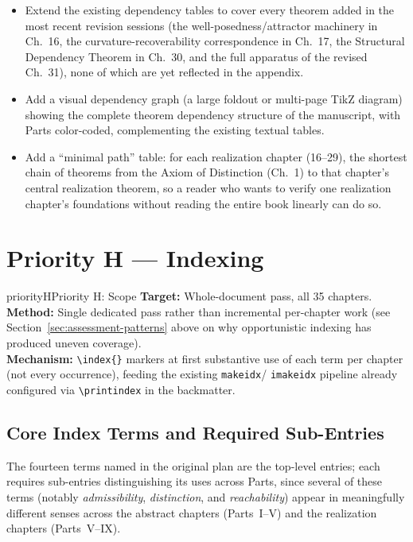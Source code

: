 \documentclass[11pt]{report}
\begin{document}
\begin{itemize}
\item Extend the existing dependency tables to cover every
  theorem added in the most recent revision sessions (the
  well-posedness/attractor machinery in Ch.~16, the
  curvature-recoverability correspondence in Ch.~17, the
  Structural Dependency Theorem in Ch.~30, and the full
  apparatus of the revised Ch.~31), none of which are yet
  reflected in the appendix.
\item Add a visual dependency graph (a large foldout or
  multi-page TikZ diagram) showing the complete theorem
  dependency structure of the manuscript, with Parts color-coded,
  complementing the existing textual tables.
\item Add a ``minimal path'' table: for each realization chapter
  (16--29), the shortest chain of theorems from the Axiom of
  Distinction (Ch.~1) to that chapter's central realization
  theorem, so a reader who wants to verify one realization
  chapter's foundations without reading the entire book linearly
  can do so.
\end{itemize}

\chapter{Priority H --- Indexing}
\label{ch:priority-h}

\begin{prioritybox}{priorityH}{Priority H: Scope}
\textbf{Target:} Whole-document pass, all 35 chapters.\\
\textbf{Method:} Single dedicated pass rather than incremental
  per-chapter work (see Section~\ref{sec:assessment-patterns}
  above on why opportunistic indexing has produced uneven
  coverage).\\
\textbf{Mechanism:} \texttt{\textbackslash index\{\}} markers
  at first substantive use of each term per chapter (not every
  occurrence), feeding the existing \texttt{makeidx}/
  \texttt{imakeidx} pipeline already configured via
  \texttt{\textbackslash printindex} in the backmatter.
\end{prioritybox}

\section{Core Index Terms and Required Sub-Entries}

The fourteen terms named in the original plan are the
top-level entries; each requires sub-entries distinguishing its
uses across Parts, since several of these terms (notably
\textit{admissibility}, \textit{distinction}, and
\textit{reachability}) appear in meaningfully different senses
across the abstract chapters (Parts~I--V) and the realization
chapters (Parts~V--IX).
\end{document}
